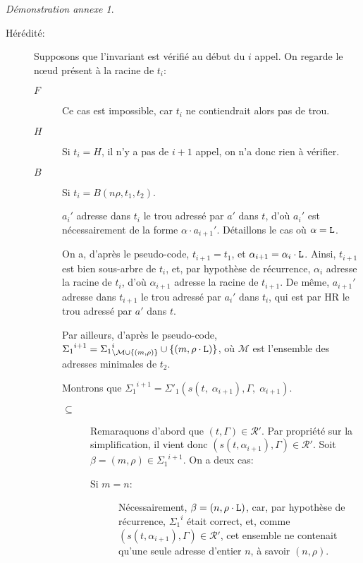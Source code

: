 \documentclass[11pt,a4paper]{article}
\theoremstyle{plain}
\theoremstyle{definition}
\theoremstyle{remark}
\newtheorem{demonstrationappendix}{Démonstration annexe}
\newcommand*{\someadd}{\rho}
\newcommand*{\sequent}{\Gamma}
\newcommand*{\Left}{\textnormal{\texttt{L}}}
\newcommand*{\representationspartial}{\ensuremath{\mathcal{R'}}}
\newcommand*{\highapprox}{\ensuremath{\Sigma_1}}
\newcommand*{\highapproxspec}{\ensuremath{\Sigma'_1}}
\newcommand*{\treesimplify}{\ensuremath{s}}
\begin{document}
\begin{demonstrationappendix}
\begin{description}
        \item[Hérédité:] Supposons que l'invariant est vérifié au début du $i$\ieme{} appel. On regarde le n\oe ud présent à la racine de $t_i$:

        \begin{description}
            \item[$F$]
                Ce cas est impossible, car $t_i$ ne contiendrait alors pas de trou.
                
            \item[$H$]
                Si $t_i = H$, il n'y a pas de $i+1$\ieme{} appel, on n'a donc rien à vérifier. 

            \item[$B$] Si $t_i = B(n\rho, t_1, t_2)$.

            $a_i'$ adresse dans $t_i$ le trou adressé par $a'$ dans $t$, d'où $a_i'$ est nécessairement de la forme $\alpha \cdot a_{i+1}'$. Détaillons le cas où $\alpha = \Left$.

            On a, d'après le pseudo-code, $t_{i+1} = t_1$, et $\alpha_{i+1} = \alpha_i \cdot \Left$. Ainsi, $t_{i+1}$ est bien sous-arbre de $t_i$, et, par hypothèse de récurrence, $\alpha_i$ adresse la racine de $t_i$, d'où $\alpha_{i+1}$ adresse la racine de $t_{i+1}$. De même, $a_{i+1}'$ adresse dans $t_{i+1}$ le trou adressé par $a_i'$ dans $t_i$, qui est par HR le trou adressé par $a'$ dans $t$.
            
            Par ailleurs, d'après le pseudo-code, ${\highapprox}^{i+1} = {\highapprox}^{i}_{\setminus \mathcal{M} \cup \{ (m, \someadd) \}} \cup \left\{ (m, \someadd \cdot \Left) \right\}$, où $\mathcal{M}$ est l'ensemble des adresses minimales de $t_2$.

            Montrons que ${\highapprox}^{i+1} = \highapproxspec \left( \treesimplify( t, \; {\alpha}_{i+1} ), \sequent, \; {\alpha}_{i+1} \right)$.

            \begin{description}
                \item[$\subseteq$] 
                    Remaraquons d'abord que $(t, \sequent) \in \representationspartial$. Par propriété sur la simplification, il vient donc $(s(t, \alpha_{i+1}), \sequent) \in \representationspartial$. Soit $\beta = (m, \someadd) \in {\highapprox}^{i+1}$. On a deux cas:

                    \begin{description}
                        \item[Si $m = n$:] 
                            Nécessairement, $\beta = (n, \rho \cdot \Left)$, car, par hypothèse de récurrence, ${\highapprox}^{i}$ était correct, et, comme $(s(t, \alpha_{i+1}), \sequent) \in \representationspartial$, cet ensemble ne contenait qu'une seule adresse d'entier $n$, à savoir $(n, \rho)$.
                            

\end{description}
\end{description}
\end{description}
\end{description}
\end{demonstrationappendix}
\end{document}
